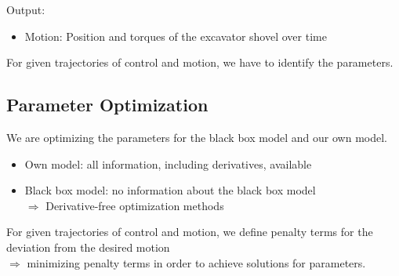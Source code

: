 \documentclass[a4paper]{article}
\begin{document}
Output:

\begin{itemize}
	\item{Motion: Position and torques of the excavator shovel over time}
\end{itemize}

For given trajectories of control and motion, we have to identify the parameters.

\subsection{Parameter Optimization}

We are optimizing the parameters for the black box model and our own model.

\begin{itemize}
	\item{Own model: all information, including derivatives, available}
	\item{Black box model: no information about the black box model \\
		$\Rightarrow$ Derivative-free optimization methods}
\end{itemize}

For given trajectories of control and motion, we define penalty terms for the deviation from the desired motion \\

$\Rightarrow$ minimizing penalty terms in order to achieve solutions for parameters.
\end{document}
